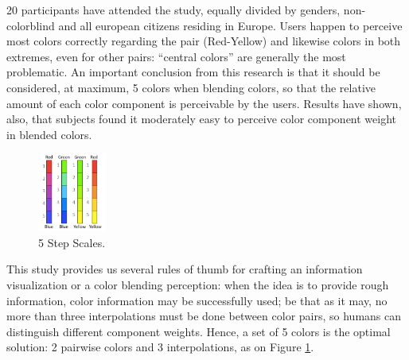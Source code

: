 \documentclass{report}
\begin{document}
20 participants have attended the study, equally divided by genders, non-colorblind and all european
citizens residing in Europe. Users happen to perceive most colors correctly regarding the pair (Red-Yellow)
and likewise colors in both extremes, even for other pairs: “central colors” are generally the most
problematic. An important conclusion from this research is that it should be considered, at maximum, 5
colors when blending colors, so that the relative amount of each color component is perceivable by the
users. Results have shown, also, that subjects found it moderately easy to perceive color component
weight in blended colors. \par
%
\begin{figure}
	\centering
    \vspace{-3\baselineskip}
    \includegraphics[width=0.2\textwidth]{TotalAmount2.png}
    \caption[Perception of Relative Amounts of Color - Smaller Ruler]{5 Step Scales.
    \protect\cite{Gama20142}}
    \label{fig:amount2}
\end{figure}
%
This study provides us several rules of thumb for crafting an information visualization or a color
blending perception: when the idea is to provide rough information, color information may be successfully
used; be that as it may, no more than three interpolations must be done between color pairs, so humans
can distinguish different component weights. Hence, a set of 5 colors is the optimal solution: 2
pairwise colors and 3 interpolations, as on Figure \ref{fig:amount2}. \par
%
\end{document}
